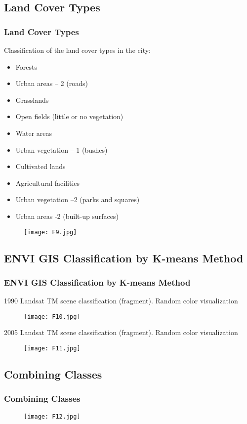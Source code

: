 \documentclass[pdflatex,compress,8pt,
	xcolor={dvipsnames,dvipsnames,svgnames,x11names,table},
	hyperref={	
	breaklinks = true, 
	pdfauthor={Lemenkova Polina}, 
	pdfsubject={Preentation}, 
	pdfcreator={Lemenkova Polina}, 
	pdfproducer={Lemenkova Polina}, 
	colorlinks=true,
	linkcolor=Gold1, 
	citecolor=NavyBlue, 
	urlcolor = NavyBlue, 
	breaklinks = true}]{beamer}
\begin{document}
\subsection{Land Cover Types}
\begin{frame}\frametitle{Land Cover Types}
Classification of the land cover types in the city:
\begin{itemize}
	\item Forests
	\item Urban areas – 2 (roads)
	\item Grasslands
	\item Open fields (little or no vegetation)
	\item Water areas
	\item Urban vegetation – 1 (bushes)
	\item Cultivated lands
	\item Agricultural facilities
	\item Urban vegetation –2 (parks and squares)
	\item Urban areas -2 (built-up surfaces)
\end{itemize}

\begin{figure}[H]
	\centering
		\texttt{[image: F9.jpg]}
\end{figure}
\end{frame}

\subsection{ENVI GIS Classification by K-means Method}
\begin{frame}\frametitle{ENVI GIS Classification by K-means Method}
\small{1990 Landsat TM scene classification (fragment). Random color visualization}
\begin{figure}[H]
	\centering
		\texttt{[image: F10.jpg]}
\end{figure}
\small{2005 Landsat TM scene classification (fragment). Random color visualization}
\begin{figure}[H]
	\centering
		\texttt{[image: F11.jpg]}
\end{figure}
\end{frame}

\subsection{Combining Classes}
\begin{frame}\frametitle{Combining Classes}
\begin{figure}[H]
	\centering
		\texttt{[image: F12.jpg]}
\end{figure}
\end{frame}
\end{document}
